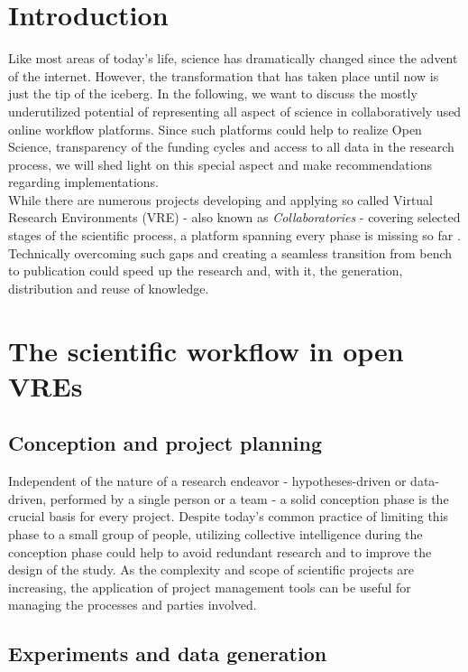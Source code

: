 \documentclass{article}
\begin{document}
\section{Introduction}

Like most areas of today's life, science has dramatically changed
since the advent of the internet. However, the transformation that has
taken place until now is just the tip of the iceberg. In the
following, we want to discuss the mostly underutilized potential of
representing all aspect of science in collaboratively used online
workflow platforms. Since such platforms could help to realize Open
Science, transparency of the funding cycles and access to all data in
the research process, we will shed light on this special aspect and
make recommendations regarding implementations.\\

While there are numerous projects developing and applying so called
Virtual Research Environments (VRE) - also known as
\textit{Collaboratories} - covering selected stages of the scientific
process, a platform spanning every phase is missing so far
\cite{Carusi}. Technically overcoming such gaps and creating a
seamless transition from bench to publication could speed up the
research and, with it, the generation, distribution and reuse of
knowledge.

\section{The scientific workflow in open VREs}

\subsection{Conception and project planning}

Independent of the nature of a research endeavor - hypotheses-driven
or data-driven, performed by a single person or a team - a solid
conception phase is the crucial basis for every project. Despite
today's common practice of limiting this phase to a small group of
people, utilizing collective intelligence during the conception phase
could help to avoid redundant research and to improve the design of
the study. As the complexity and scope of scientific projects are
increasing, the application of project management tools can be useful
for managing the processes and parties involved.

\subsection{Experiments and data generation}
\end{document}
